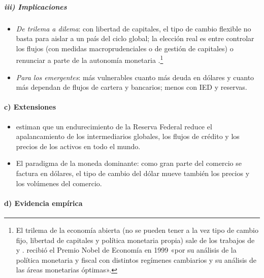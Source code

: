 \documentclass[11pt]{article}
\begin{document}
\begin{infografia}[H]
\centering
\caption{El ciclo financiero global}\label{figu:ciclo-global}
\end{infografia}

\subparagraph{iii) Implicaciones}

\begin{itemize}
\item \emph{De trilema a dilema}: con libertad de capitales, el tipo de cambio flexible no basta para aislar a un país del ciclo global; la elección real es entre controlar los flujos (con medidas macroprudenciales o de gestión de capitales) o renunciar a parte de la autonomía monetaria .\footnote{El trilema de la economía abierta (no se pueden tener a la vez tipo de cambio fijo, libertad de capitales y política monetaria propia) sale de los trabajos de  y .  recibió el Premio Nobel de Economía en 1999 «por su análisis de la política monetaria y fiscal con distintos regímenes cambiarios y su análisis de las áreas monetarias óptimas»\nocite{Nobel1999Mundell}.}
\item \emph{Para los emergentes}: más vulnerables cuanto más deuda en dólares y cuanto más dependan de flujos de cartera y bancarios; menos con IED y reservas.
\end{itemize}

\paragraph{c) Extensiones}

\begin{itemize}
\item \textcite{MirandaAgrippinoRey2020} estiman que un endurecimiento de la Reserva Federal reduce el apalancamiento de los intermediarios globales, los flujos de crédito y los precios de los activos en todo el mundo.
\item El paradigma de la moneda dominante: como gran parte del comercio se factura en dólares, el tipo de cambio del dólar mueve también los precios y los volúmenes del comercio\nocite{Gopinath2020DCP}.
\end{itemize}

\paragraph{d) Evidencia empírica}
\end{document}
